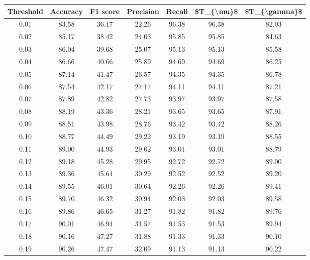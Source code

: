 \begin{tabular}{|c|c|c|c|c|c|c|}
\hline
 Threshold &  Accuracy &  F1 score &  Precision &  Recall &  \$T\_\{\textbackslash mu\}\$ &  \$T\_\{\textbackslash gamma\}\$ \\
\hline
      0.01 &     83.58 &     36.17 &      22.26 &   96.38 &      96.38 &         82.93 \\
      0.02 &     85.17 &     38.42 &      24.03 &   95.85 &      95.85 &         84.63 \\
      0.03 &     86.04 &     39.68 &      25.07 &   95.13 &      95.13 &         85.58 \\
      0.04 &     86.66 &     40.66 &      25.89 &   94.69 &      94.69 &         86.25 \\
      0.05 &     87.14 &     41.47 &      26.57 &   94.35 &      94.35 &         86.78 \\
      0.06 &     87.54 &     42.17 &      27.17 &   94.11 &      94.11 &         87.21 \\
      0.07 &     87.89 &     42.82 &      27.73 &   93.97 &      93.97 &         87.58 \\
      0.08 &     88.19 &     43.36 &      28.21 &   93.65 &      93.65 &         87.91 \\
      0.09 &     88.51 &     43.98 &      28.76 &   93.42 &      93.42 &         88.26 \\
      0.10 &     88.77 &     44.49 &      29.22 &   93.19 &      93.19 &         88.55 \\
      0.11 &     89.00 &     44.93 &      29.62 &   93.01 &      93.01 &         88.79 \\
      0.12 &     89.18 &     45.28 &      29.95 &   92.72 &      92.72 &         89.00 \\
      0.13 &     89.36 &     45.64 &      30.29 &   92.52 &      92.52 &         89.20 \\
      0.14 &     89.55 &     46.01 &      30.64 &   92.26 &      92.26 &         89.41 \\
      0.15 &     89.70 &     46.32 &      30.94 &   92.03 &      92.03 &         89.58 \\
      0.16 &     89.86 &     46.65 &      31.27 &   91.82 &      91.82 &         89.76 \\
      0.17 &     90.01 &     46.94 &      31.57 &   91.53 &      91.53 &         89.94 \\
      0.18 &     90.16 &     47.27 &      31.88 &   91.33 &      91.33 &         90.10 \\
      0.19 &     90.26 &     47.47 &      32.09 &   91.13 &      91.13 &         90.22 \\

\end{tabular}
